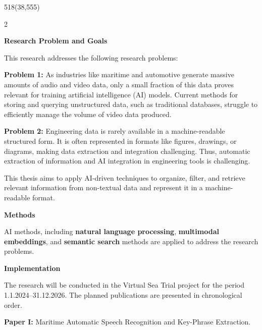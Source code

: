 \documentclass{article}
\makeatletter
\newcommand{\bodyTop}{555}         %
\newcommand{\bodyLeft}{38}         %
\newcommand{\bodyWidth}{518}       %
\renewcommand{\section}[1]{%
  \par\addvspace{1.2em}%
  {\headingfont\bfseries\fontsize{34pt}{40pt}\selectfont
   \color{poster@text}#1\par}%
  \nopagebreak\addvspace{0.15em}%
}
\newcommand{\poslabel}[1]{\textbf{#1}}
\makeatother
\begin{document}
\begin{textblock}{\bodyWidth}(\bodyLeft,\bodyTop)
  \color{poster@text}\fontsize{17pt}{24pt}\selectfont\RaggedRight
  \setlength{\columnsep}{18mm}
  \begin{multicols}{2}

    \section{Research Problem and Goals}
    This research addresses the following research problems:

    \poslabel{Problem 1:} As industries like maritime and automotive generate
    massive amounts of audio and video data, only a small fraction of this
    data proves relevant for training artificial intelligence (AI) models.
    Current methods for storing and querying unstructured data, such as
    traditional databases, struggle to efficiently manage the volume of
    video data produced.

    \poslabel{Problem 2:} Engineering data is rarely available in a
    machine-readable structured form. It is often represented in formats
    like figures, drawings, or diagrams, making data extraction and
    integration challenging. Thus, automatic extraction of information and
    AI integration in engineering tools is challenging.

    This thesis aims to apply AI-driven techniques to organize, filter, and
    retrieve relevant information from non-textual data and represent it in
    a machine-readable format.

    \section{Methods}
    AI methods, including \textbf{natural language processing},
    \textbf{multimodal embeddings}, and \textbf{semantic search} methods are
    applied to address the research problems.

    \section{Implementation}
    The research will be conducted in the Virtual Sea Trial project for the
    period 1.1.2024--31.12.2026. The planned publications are presented in
    chronological order.

    \poslabel{Paper I:} Maritime Automatic Speech Recognition and Key-Phrase
    Extraction.


\end{multicols}
\end{textblock}
\end{document}
